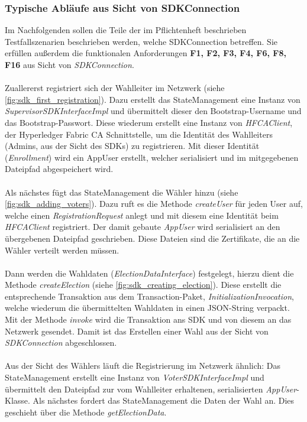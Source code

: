 \documentclass[parskip=full]{scrartcl}
\begin{document}
	\subsubsection{Typische Abläufe aus Sicht von SDKConnection}
	Im Nachfolgenden sollen die Teile der im Pflichtenheft beschrieben Testfallszenarien beschrieben werden, welche SDKConnection betreffen. Sie erfüllen außerdem die funktionalen Anforderungen \textbf{F1, F2, F3, F4, F6, F8, F16} aus Sicht von \textit{SDKConnection}.
	\\ \\ 
	Zuallererst registriert sich der Wahlleiter im Netzwerk (siehe \autoref{fig:sdk_first_registration}). Dazu erstellt das StateManagement eine Instanz von \textit{SupervisorSDKInterfaceImpl} und übermittelt dieser den Bootstrap-Username und das Bootstrap-Passwort. Diese wiederum erstellt eine Instanz von \textit{HFCAClient}, der Hyperledger Fabric CA Schnittstelle, um die Identität des Wahlleiters (Admins, aus der Sicht des SDKs) zu registrieren. Mit dieser Identität (\textit{Enrollment}) wird ein AppUser erstellt, welcher serialisiert und im mitgegebenen Dateipfad abgespeichert wird.
	\\ \\
	Als nächstes fügt das StateManagement die Wähler hinzu (siehe \autoref{fig:sdk_adding_voters}). Dazu ruft es die Methode \textit{createUser} für jeden User auf, welche einen \textit{RegistrationRequest} anlegt und mit diesem eine Identität beim \textit{HFCAClient} registriert. Der damit gebaute \textit{AppUser} wird serialisiert an den übergebenen Dateipfad geschrieben. Diese Dateien sind die Zertifikate, die an die Wähler verteilt werden müssen.
	\\ \\
	Dann werden die Wahldaten (\textit{ElectionDataInterface}) festgelegt, hierzu dient die Methode \textit{createElection} (siehe \autoref{fig:sdk_creating_election}). Diese erstellt die entsprechende Transaktion aus dem Transaction-Paket, \textit{InitializationInvocation}, welche wiederum die übermittelten Wahldaten in einen JSON-String verpackt. Mit der Methode \textit{invoke} wird die Transaktion ans SDK und von diesem an das Netzwerk gesendet.
	Damit ist das Erstellen einer Wahl aus der Sicht von \textit{SDKConnection} abgeschlossen. 
	\\ \\
	Aus der Sicht des Wählers läuft die Registrierung im Netzwerk ähnlich: Das StateManagement erstellt eine Instanz von \textit{VoterSDKInterfaceImpl} und übermittelt den Dateipfad zur vom Wahlleiter erhaltenen, serialisierten \textit{AppUser}-Klasse. Als nächstes fordert das StateManagement die Daten der Wahl an. Dies geschieht über die Methode \textit{getElectionData}.
\end{document}
